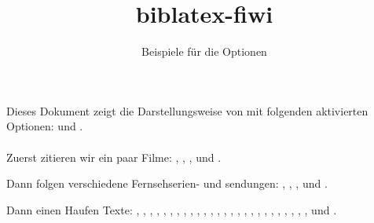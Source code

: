 \documentclass[a4paper]{scrartcl}
\begin{document}
\title{biblatex-fiwi}\subtitle{Beispiele für die Optionen}\date{}\maketitle
\noindent Dieses Dokument zeigt die Darstellungsweise von  mit folgenden aktivierten Optionen:   und . \\ \\

\noindent Zuerst zitieren wir ein paar Filme: , , ,  und .

Dann folgen verschiedene Fernsehserien- und sendungen: , , ,  und .

Dann einen Haufen Texte: \textcite{sklovskij.v:1969a} \textcite{Spiegel.S:2010c}, \textcite{Muller.A:2010a}, \textcite{Wells.H:1908}, \textcite{Spiegel.S:2007b}, \textcite{Lukian.1981}, \textcite{Kepler.J:1993}, \textcite{Coleridge:1983a}, \textcite{vonMatt.P:2002}, \textcite{Keitz.U:2004a}, \textcite{Wells.HG:1980}, \textcite{Ackerman.Strickland:1981}, \textcite{Anderson.P:1971a}, \textcite{Gaudreault.A:1993}, \textcite{Poe.E:1982c}, \textcite{Poe.E:1999a}, \textcite{Parrinder.P:1980}, \textcite{Wells.H:1980*2}, \textcite{James.H:2004a}, \textcite{James.H:2007a}, \textcite{Hedeler.W:2005a}, \textcite{Ballhausen.T:2009a}, \textcite{Zymner.R:2003a}, \textcite{Zymner.R:2011a}, \textcite{Nelmes.J:2011b}, \textcite{Kuhn.A:1990*2,Blish.J:1973a,Dureau.Y:2005a}, \textcite{Todorov.T:1992}, \textcite{Bordwell.D:2004a} und \textcite{Kirchner.A:2008a}.


\printbibliography[nottype=movie]
\printbibliography[type=movie,heading=film,sorting=title]
\end{document}
